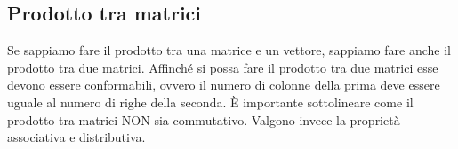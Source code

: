 \documentclass{article}     %
\begin{document}
\begin{ex}
    \grid[10.4cm]{}
\end{ex}
\subsection{Prodotto tra matrici}
Se sappiamo fare il prodotto tra una matrice e un vettore, sappiamo fare anche il prodotto tra due matrici. Affinché si possa fare il prodotto tra due matrici esse devono essere conformabili, ovvero il numero di colonne della prima deve essere uguale al numero di righe della seconda. È importante sottolineare come il prodotto tra matrici NON sia commutativo. Valgono invece la proprietà associativa e distributiva.
\end{document}
